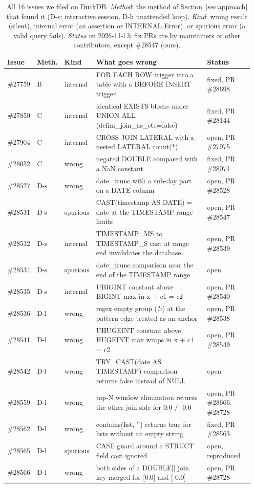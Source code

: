 \begin{table}[t]
\caption{All 16 issues we filed on DuckDB. \emph{Method}: the method of Section~\ref{sec:approach} that found it (D-s: interactive session, D-l: unattended loop). \emph{Kind}: wrong result (silent), internal error (an assertion or INTERNAL Error), or spurious error (a valid query fails). \emph{Status} on 2026-11-13; fix PRs are by maintainers or other contributors, except \#28547 (ours).}
\label{tab:issues}
\scriptsize\centering
\setlength{\tabcolsep}{3pt}
\begin{tabular}{lllp{7.0cm}p{3.0cm}}
\toprule
Issue & Meth. & Kind & What goes wrong & Status \\
\midrule
\#27759 & B & internal & FOR EACH ROW trigger into a table with a BEFORE INSERT trigger & fixed, PR \#28698 \\
\#27850 & C & internal & identical EXISTS blocks under UNION ALL (delim\_join\_as\_cte=false) & fixed, PR \#28144 \\
\#27904 & C & internal & CROSS JOIN LATERAL with a nested LATERAL count(*) & open, PR \#27975 \\
\#28052 & C & wrong & negated DOUBLE compared with a NaN constant & fixed, PR \#28071 \\
\#28527 & D-s & wrong & date\_trunc with a sub-day part on a DATE column & open, PR \#28528 \\
\#28531 & D-s & spurious & CAST(timestamp AS DATE) = date at the TIMESTAMP range limits & open, PR \#28547 \\
\#28532 & D-s & internal & TIMESTAMP\_MS to TIMESTAMP\_S cast at range end invalidates the database & open, PR \#28539 \\
\#28534 & D-s & spurious & date\_trunc comparison near the end of the TIMESTAMP range & open \\
\#28535 & D-s & internal & UBIGINT constant above BIGINT max in x + c1 = c2 & open, PR \#28540 \\
\#28536 & D-l & wrong & regex empty group (?:) at the pattern edge treated as an anchor & open, PR \#28538 \\
\#28541 & D-l & wrong & UHUGEINT constant above HUGEINT max wraps in x + c1 = c2 & open, PR \#28549 \\
\#28542 & D-l & wrong & TRY\_CAST(date AS TIMESTAMP) comparison returns false instead of NULL & open \\
\#28559 & D-l & wrong & top-N window elimination returns the other join side for 0.0 / -0.0 & open, PR \#28666, \#28728 \\
\#28562 & D-l & wrong & contains(list, '') returns true for lists without an empty string & fixed, PR \#28563 \\
\#28565 & D-l & spurious & CASE guard around a STRUCT field cast ignored & open, reproduced \\
\#28566 & D-l & wrong & both sides of a DOUBLE[] join key merged for [0.0] and [-0.0] & open, PR \#28728 \\
\bottomrule
\end{tabular}
\end{table}
